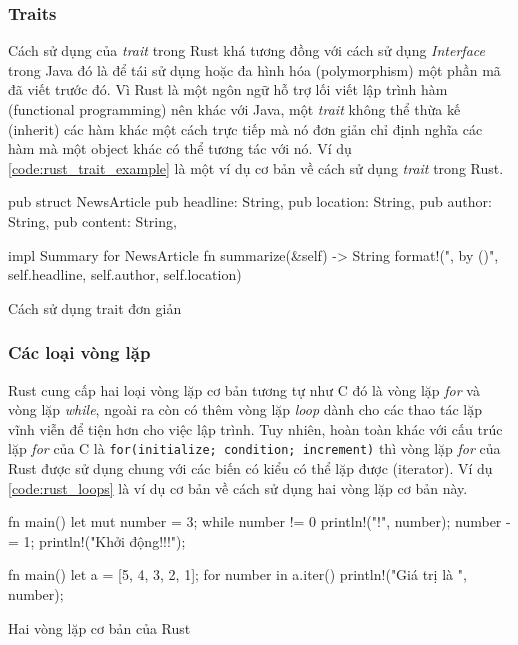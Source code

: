 \subsubsection{Traits}
Cách sử dụng của \emph{trait} trong Rust khá tương đồng với cách sử dụng \emph{Interface} trong Java đó là để tái sử dụng hoặc đa hình hóa (polymorphism) một phần mã đã viết trước đó.
Vì Rust là một ngôn ngữ hỗ trợ lối viết lập trình hàm (functional programming) nên khác với Java, một \emph{trait} không thể thừa kế (inherit) các hàm khác một cách trực tiếp mà nó đơn giản chỉ định nghĩa các hàm mà một object khác có thể tương tác với nó.
Ví dụ \ref{code:rust_trait_example} là một ví dụ cơ bản về cách sử dụng \emph{trait} trong Rust.
\begin{listing}[ht]
\begin{rustcode}
pub struct NewsArticle {
    pub headline: String,
    pub location: String,
    pub author: String,
    pub content: String,
}

impl Summary for NewsArticle {
    fn summarize(&self) -> String {
        format!("{}, by {} ({})", self.headline, self.author, self.location)
    }
}
\end{rustcode}
\caption{Cách sử dụng trait đơn giản}
\label{code:rust_trait_example}
\end{listing}

\subsubsection{Các loại vòng lặp}
Rust cung cấp hai loại vòng lặp cơ bản tương tự như C đó là vòng lặp \emph{for} và vòng lặp \emph{while}, ngoài ra còn có thêm vòng lặp \emph{loop} dành cho các thao tác lặp vĩnh viễn để tiện hơn cho việc lập trình.
Tuy nhiên, hoàn toàn khác với cấu trúc lặp \emph{for} của C là \texttt{for(initialize; condition; increment)} thì vòng lặp \emph{for} của Rust được sử dụng chung với các biến có kiểu có thể lặp được (iterator).
Ví dụ \ref{code:rust_loops} là ví dụ cơ bản về cách sử dụng hai vòng lặp cơ bản này.

\begin{center}
\begin{listing}
\begin{minipage}[ht]{0.4\linewidth}
\begin{rustcode}
fn main() {
    let mut number = 3;
    while number != 0 {
        println!("{}!", number);
        number -= 1;
    }
    println!("Khởi động!!!");
}
\end{rustcode}
\end{minipage}
\qquad
\begin{minipage}[ht]{0.5\linewidth}
\begin{rustcode}
fn main() {
    let a = [5, 4, 3, 2, 1];
    for number in a.iter() {
        println!("Giá trị là {}", number);
    }
}
\end{rustcode}
\end{minipage}
\caption{Hai vòng lặp cơ bản của Rust}
\label{code:rust_loops}
\end{listing}
\end{center}

